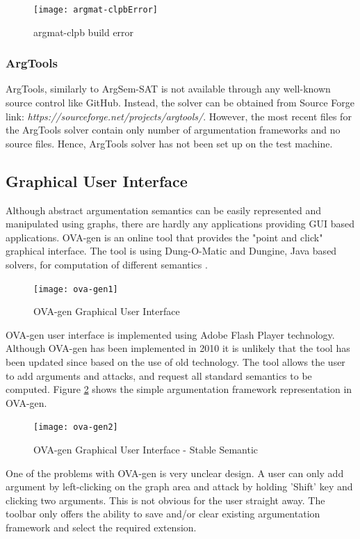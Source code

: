 \begin{figure}[h]
	\centering
	\texttt{[image: argmat-clpbError]}
	\caption{argmat-clpb build error}
	\label{fig:argmatClpbError}
\end{figure}

\subsubsection{ArgTools}
ArgTools, similarly to ArgSem-SAT is not available through any well-known source control like GitHub. Instead, the solver can be obtained from Source Forge link: \textit{https://sourceforge.net/projects/argtools/}. However, the most recent files for the ArgTools solver contain only number of argumentation frameworks and no source files. Hence, ArgTools solver has not been set up on the test machine.


\subsection{Graphical User Interface}
Although abstract argumentation semantics can be easily represented and manipulated using graphs, there are hardly any applications providing GUI based applications. OVA-gen is an online tool that provides the "point and click" graphical interface. The tool is using Dung-O-Matic and Dungine, Java based solvers, for computation of different semantics \citep{ova-gen}. 

\begin{figure}[h]
	\centering
	\texttt{[image: ova-gen1]}
	\caption{OVA-gen Graphical User Interface}
	\label{fig:ovagen1}
\end{figure}

OVA-gen user interface is implemented using Adobe Flash Player technology. Although OVA-gen has been implemented in 2010 it is unlikely that the tool has been updated since based on the use of old technology. The tool allows the user to add arguments and attacks, and request all standard semantics to be computed. Figure \ref{fig:ovagen1} shows the simple argumentation framework representation in OVA-gen.

\begin{figure}[h]
	\centering
	\texttt{[image: ova-gen2]}
	\caption{OVA-gen Graphical User Interface - Stable Semantic}
	\label{fig:ovagen2}
\end{figure}

One of the problems with OVA-gen is very unclear design. A user can only add argument by left-clicking on the graph area and attack by holding 'Shift' key and clicking two arguments. This is not obvious for the user straight away. The toolbar only offers the ability to save and/or clear existing argumentation framework and select the required extension. 

